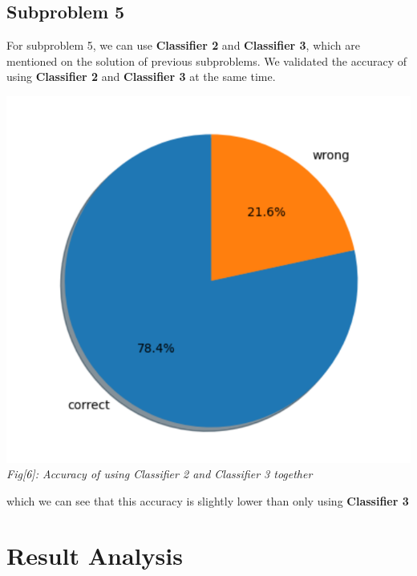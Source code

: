 \documentclass[12pt]{article}
\begin{document}
		\subsection{Subproblem 5}
			For subproblem 5, we can use \textbf{Classifier 2} and \textbf{Classifier 3},
			which are mentioned on the solution of previous subproblems.
			We validated the accuracy of using \textbf{Classifier 2} and \textbf{Classifier 3}
			at the same time.
			
			\begin{center}
				\includegraphics[scale=0.8]{fig6} \\
				\textit{Fig[6]: Accuracy of using Classifier 2 and Classifier 3 together}
				\vspace{3mm}
			\end{center}
			
			\noindent which we can see that this accuracy is slightly lower than only using
			\textbf{Classifier 3}
	
	\newpage
	\section{Result Analysis}
\end{document}
